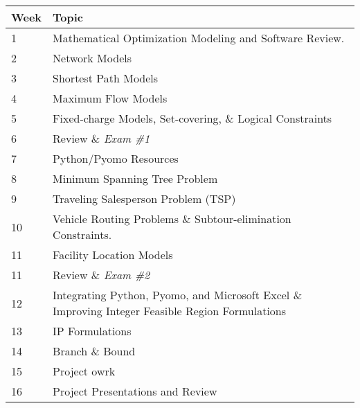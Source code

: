 \documentclass[12pt]{article}
\theoremstyle{definition}
\begin{document}
\renewcommand\arraystretch{1.5}
\begin{longtable}{ll}
Week \hspace{.2in} & Topic \\
\hline 
1 & Mathematical Optimization Modeling and Software Review.  \\
2 & Network Models\\
3 & Shortest Path Models\\ 
4 & Maximum Flow Models\\
5 &  Fixed-charge Models, Set-covering, \& Logical Constraints \\
6 & Review \& \textit{Exam \#1} \\
7 & Python/Pyomo Resources\\
8 & Minimum Spanning Tree Problem \\
9 & Traveling Salesperson Problem (TSP) \\
10 & Vehicle Routing Problems \& Subtour-elimination Constraints. \\
11 & Facility Location Models \\
11 & Review \& \textit{Exam \#2}  \\
12 & Integrating Python, Pyomo, and Microsoft Excel \& Improving Integer Feasible Region Formulations \\
13 & IP Formulations\\
14 & Branch \& Bound \\
15 & Project owrk\\
16 & Project Presentations and Review \\
\end{longtable}
\end{document}
